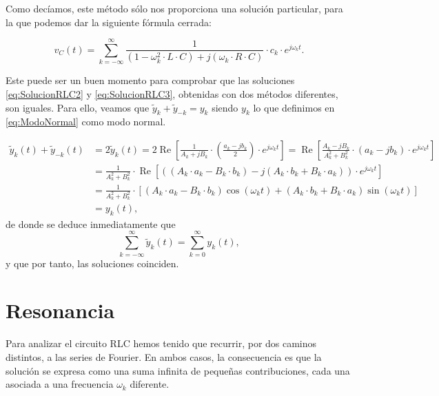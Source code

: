 Como decíamos, este método sólo nos proporciona una solución particular, para la que podemos dar la siguiente fórmula cerrada:
\begin{mybox} \vspace{-4mm}
  \begin{equation}
    \label{eq:SolucionRLC3}
    v_C(t) = \sum_{k=-\infty}^\infty \frac{1}{(1-\omega_k^2 \cdot L\cdot C) + j(\omega_k \cdot R\cdot C)}\cdot c_k \cdot e^{j\omega_k t}.
  \end{equation}
\end{mybox}

Este puede ser un buen momento para comprobar que las soluciones \eqref{eq:SolucionRLC2} y \eqref{eq:SolucionRLC3}, obtenidas con dos métodos diferentes, son iguales. Para ello, veamos que $ \tilde{y}_k + \tilde{y}_{-k} = y_k$ siendo $y_k$ lo que definimos en \eqref{eq:ModoNormal} como modo normal.

\begin{align*}
   \tilde{y}_k(t) + \tilde{y}_{-k}(t) 
   &= 2 \tilde{y}_k(t) = 2\operatorname{Re}\left[ \frac{1}{A_k + jB_k}\cdot  \left(\frac{a_k-jb_k}{2}\right)\cdot e^{j\omega_k t} \right] = \operatorname{Re}\left[ \frac{A_k-jB_k}{A_k^2 + B_k^2}\cdot \left(a_k-jb_k\right)\cdot e^{j\omega_k t} \right] \\
   &=  \frac{1}{A_k^2 + B_k^2} \cdot \operatorname{Re}\left[ ((A_k\cdot a_k - B_k\cdot b_k) - j(A_k\cdot b_k + B_k\cdot a_k)) \cdot e^{j\omega_k t} \right] \\
   &= \frac{1}{A_k^2 + B_k^2}\cdot \left[ (A_k\cdot a_k - B_k\cdot b_k)\cos(\omega_k t) + (A_k\cdot b_k + B_k\cdot a_k)\sin(\omega_k t) \right]\\
   &= y_k(t),
\end{align*}
de donde se deduce inmediatamente que
\[
\sum_{k=-\infty}^\infty \tilde{y}_k(t) = \sum_{k=0}^\infty y_k (t),
\]
y que por tanto, las soluciones coinciden.















\section{Resonancia}
Para analizar el circuito RLC hemos tenido que recurrir, por dos caminos distintos, a las series de Fourier. En ambos casos, la consecuencia es que la solución se expresa como una suma infinita de pequeñas contribuciones, cada una asociada a una frecuencia $\omega_k$ diferente.


